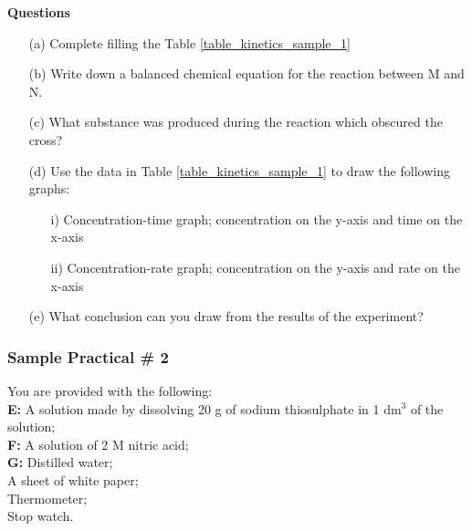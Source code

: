 \vspace*{-7mm}
\noindent \textbf{Questions}
\begin{enumerate}[topsep=0ex,itemsep=0ex,partopsep=1ex,parsep=1ex]
	\item[(a)] Complete filling the Table \ref{table_kinetics_sample_1}
	\item[(b)] Write down a balanced chemical equation for the reaction between M and N.
	\item[(c)] What substance was produced during the reaction which obscured the cross?
	\item[(d)] Use the data in Table \ref{table_kinetics_sample_1} to draw the following graphs:
	\begin{enumerate}[topsep=0ex,itemsep=0ex,partopsep=1ex,parsep=1ex]
		\item[i)] Concentration-time graph; concentration on the y-axis and time on the x-axis
		\item[ii)] Concentration-rate graph; concentration on the y-axis and rate on the x-axis
	\end{enumerate}
	\item[(e)] What conclusion can you draw from the results of the experiment?
\end{enumerate}

\subsubsection{Sample Practical \# 2}

\noindent You are provided with the following: \\
\noindent \textbf{E:} A solution made by dissolving 20 g of sodium thiosulphate in 1 dm$^3$ of the solution; \\
\noindent \textbf{F:} A solution of 2 M nitric acid; \\
\noindent \textbf{G:} Distilled water; \\
\noindent A sheet of white paper; \\
\noindent Thermometer; \\
\noindent Stop watch. \\

